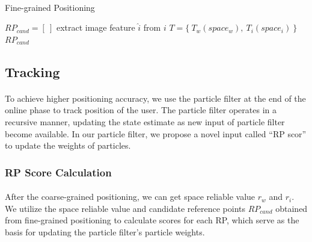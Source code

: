 \documentclass[a4paper,12pt]{report}
\begin{document}
\paragraph{}
\begin{algorithm}[H]
    \SetAlgoLined
    \DontPrintSemicolon
    \caption{Fine-grained Positioning}
    \label{Algo:fine_grained_positioning}
    \BlankLine
    \BlankLine
    $RP_{cand}=\left[ \ \right]$ 
    extract image feature $\hat{i}$ from $i$ 
    $T=\{\ T_w(space_w),\ T_i(space_i)\ \}$ 
    \Return $RP_{cand}$
\end{algorithm}

\subsection{Tracking}
\paragraph{}
To achieve higher positioning accuracy, we use the particle filter at the end of the online phase to track position of the user. The particle filter operates in a recursive manner, updating the state estimate as new input of particle filter become available. In our particle filter, we propose a novel input called ``RP scor'' to update the weights of particles.

\subsubsection{RP Score Calculation}
\paragraph{}
After the coarse-grained positioning, we can get space reliable value $r_w$ and $r_i$. We utilize the space reliable value and candidate reference points $RP_{cand}$ obtained from fine-grained positioning to calculate scores for each RP, which serve as the basis for updating the particle filter's particle weights.
\end{document}

